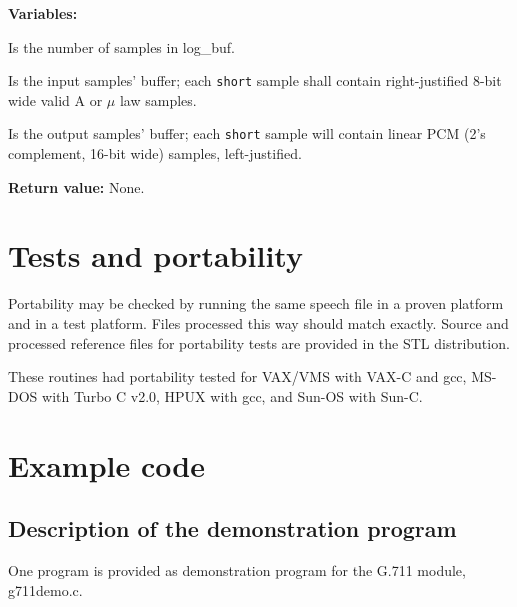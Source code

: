{\bf Variables: }
\begin{Descr}{\DescrLen}
\item[\pbox{20mm}{\em smpno}] %
               Is the number of samples in log\_buf.

\item[\pbox{20mm}{\em log\_buf}] %
               Is the input samples' buffer; each {\tt short} sample 
               shall contain right-justified 8-bit wide valid A or $\mu$ 
               law samples.

\item[\pbox{20mm}{\em lin\_buf}] %
               Is the output samples' buffer; each {\tt short} sample 
               will contain linear PCM (2's complement, 16-bit wide) 
               samples, left-justified.

\end{Descr}
        
        
        {\bf Return value: }        None.


\section{Tests and portability}  

Portability may be checked by running the same speech file in a
proven platform and in a test platform. Files processed this way
should match exactly. Source and processed reference files for
portability tests are provided in the STL distribution.

These routines had portability tested for VAX/VMS with VAX-C and gcc, 
MS-DOS with Turbo C v2.0, HPUX with gcc, and Sun-OS with Sun-C.


\section{Example code}

\subsection {Description of the demonstration program}

One program is provided as demonstration program for the G.711 module,
g711demo.c.

